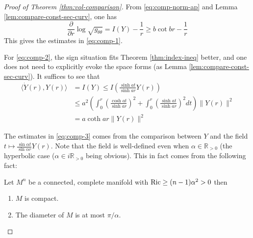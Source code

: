 \begin{proof}[Proof of Theorem \ref{thm:vol-comparison}]
From \eqref{eq:comp-norm-ap} and Lemma \ref{lem:compare-const-sec-curv}, one has 
\[
 \frac{\partial}{\partial r} \log \sqrt{g_{\theta\theta}} = I(Y) - \frac{1}{r} \geq b\cot br -\frac{1}{r}
\]
This gives the estimates in \eqref{eq:comp-1}.

For \eqref{eq:comp-2}, the sign situation fits Theorem \ref{thm:index-ineq} better, and one
does not need to explicitly evoke the space forms (as Lemma
\ref{lem:compare-const-sec-curv}). It suffices to see that
\begin{equation*}
\begin{split}
 \langle \dot Y(r), Y(r) \rangle &=I(Y) \leq I\left(\frac{\sinh at}{\sinh ar}Y(r)\right)\\
 	      	    &\leq a^2\left(\int_0^r \left(\frac{\cosh at}{\sinh ar}\right)^2 + \int_0^r \left(\frac{\sinh at}{\sinh ar}\right)^2 dt  \right)\|Y(r)\|^2\\
		    &= a\coth ar \|Y(r)\|^2
\end{split}   
\end{equation*}

The estimates in  \eqref{eq:comp-3} comes from the comparison between \(Y\) and the
field  \(t\mapsto \frac{\sin \alpha t}{\sin \alpha r}Y(r)\). Note that the field is
well-defined even when \(\alpha \in \mathbb{R}_{>0}\) (the hyperbolic case (\(\alpha\in
i \mathbb{R}_{>0}\) being obvious). This in fact comes from the following fact:
\begin{theorem}[Myers]
\label{thm:myers}
Let \(M^n\) be a connected, complete manifold with \({\rm Ric}\geq (n-1)\alpha^2 >0\)
then
\begin{enumerate}
\item \(M\) is compact.
\item The diameter of \(M\) is at most \(\pi/\alpha\).
\end{enumerate}
\end{theorem}


\end{proof}
